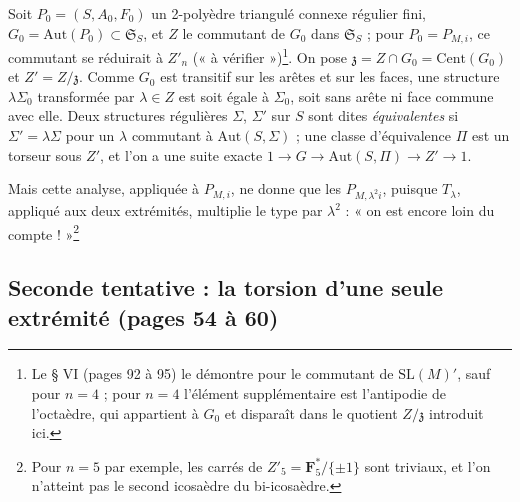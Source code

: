 \documentclass[11pt,a4paper]{article}
\begin{document}
Soit $P_0 = (S, A_0, F_0)$ un 2-polyèdre triangulé connexe régulier fini,
$G_0 = \mathrm{Aut}(P_0) \subset \mathfrak{S}_S$, et $Z$ le commutant de $G_0$
dans $\mathfrak{S}_S$ ; pour $P_0 = P_{M,i}$, ce commutant se réduirait à
$Z'_n$ (« à vérifier »)\footnote{Le § VI (pages 92 à 95) le démontre pour le
commutant de $\mathrm{SL}(M)'$, sauf pour $n = 4$ ; pour $n = 4$ l'élément
supplémentaire est l'antipodie de l'octaèdre, qui appartient à $G_0$ et
disparaît dans le quotient $Z/\mathfrak{z}$ introduit ici.}. On pose
$\mathfrak{z} = Z \cap G_0 = \mathrm{Cent}(G_0)$ et $Z' = Z/\mathfrak{z}$.
Comme $G_0$ est transitif sur les arêtes et sur les faces, une structure
$\lambda\Sigma_0$ transformée par $\lambda \in Z$ est soit égale à $\Sigma_0$,
soit sans arête ni face commune avec elle. Deux structures régulières
$\Sigma$, $\Sigma'$ sur $S$ sont dites \emph{équivalentes} si $\Sigma' =
\lambda\Sigma$ pour un $\lambda$ commutant à $\mathrm{Aut}(S, \Sigma)$ ; une
classe d'équivalence $\Pi$ est un torseur sous $Z'$, et l'on a une suite exacte
$1 \to G \to \mathrm{Aut}(S, \Pi) \to Z' \to 1$.

Mais cette analyse, appliquée à $P_{M,i}$, ne donne que les $P_{M,\lambda^2 i}$,
puisque $T_\lambda$, appliqué aux deux extrémités, multiplie le type par
$\lambda^2$ : « on est encore loin du compte ! »\footnote{Pour $n = 5$ par
exemple, les carrés de $Z'_5 = \mathbf{F}_5^{*}/\{\pm 1\}$ sont triviaux, et
l'on n'atteint pas le second icosaèdre du bi-icosaèdre.}

\subsection*{Seconde tentative : la torsion d'une seule extrémité (pages 54 à 60)}
\end{document}
